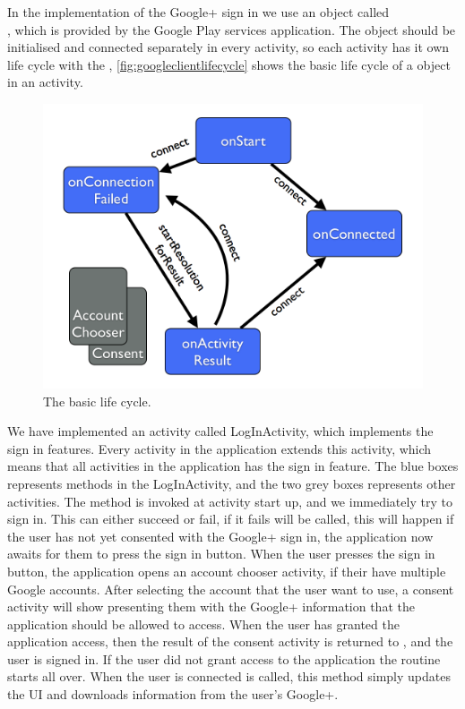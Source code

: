 In the implementation of the Google+ sign in we use an object called \\\citep{googleapiclient-docs}, which is provided by the Google Play services application. 
The object  should be initialised and connected separately in every activity, so each activity has it own life cycle with the , \autoref{fig:googleclientlifecycle} shows the basic life cycle of a  object in an activity.
\begin{figure}[H]
\centering
\includegraphics[width=0.75\linewidth]{img/googleclientflow.png}
\caption{The  basic life cycle\cite{googleapiclient-lifecycle}.}
\label{fig:googleclientlifecycle}
\end{figure}
We have implemented an activity called LogInActivity, which implements the sign in features. Every activity in the application extends this activity, which means that all activities in the application has the sign in feature. 
The blue boxes represents methods in the LogInActivity, and the two grey boxes represents other activities. The method  is invoked at activity start up, and we immediately try to sign in. 
This can either succeed or fail, if it fails  will be called, this will happen if the user has not yet consented with the Google+ sign in, the application now awaits for them to press the sign in button. 
When the user presses the sign in button, the application opens an account chooser activity, if their have multiple Google accounts. 
After selecting the account that the user want to use, a consent activity will show presenting them with the Google+ information that the application should be allowed to access. 
When the user has granted the application access, then the result of the consent activity is returned to , and the user is signed in. 
If the user did not grant access to the application the routine starts all over. When the user is connected  is called, this method simply updates the UI and downloads information from the user's Google+.

